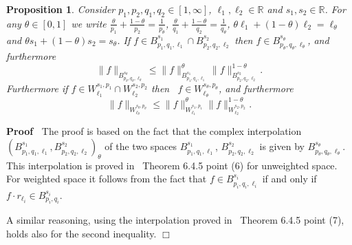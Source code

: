 \documentclass[a4paper,10pt]{article}
\newenvironment{proof}{\noindent\textbf{Proof\ }}{\hspace*{\fill}$\Box$\medskip}
\newtheorem{proposition}[theorem]{Proposition}
{\theorembodyfont{\rmfamily}\newtheorem{remark}[theorem]{Remark}}
\begin{document}
\begin{proposition}
  \label{proposition_interpolation}Consider $p_1, p_2, q_1, q_2 \in [1,
  \infty]$, $\ell_1, \ell_2 \in \mathbb{R}$ and $s_1, s_2 \in \mathbb{R}$. For
  any $\theta \in [0, 1]$ we write $\frac{\theta}{p_1} + \frac{1 -
  \theta}{p_2} = \frac{1}{p_{\theta}}$, $\frac{\theta}{q_1} + \frac{1 -
  \theta}{q_2} = \frac{1}{q_{\theta}}$, $\theta \ell_1 + (1 - \theta) \ell_2 =
  \ell_{\theta}$ and $\theta s_1 + (1 - \theta) s_2 = s_{\theta}$. If $f \in
  B^{s_1}_{p_1, q_1, \ell_1} \cap B^{s_2}_{p_2, q_2, \ell_2}$ then $f \in
  B^{s_{\theta}}_{p_{\theta}, q_{\theta}, \ell_{\theta}}$, and furthermore
  \[ \| f \|_{B^{s_{\theta}}_{p_{\theta}, q_{\theta}, \ell_{\theta}}} \leq \|
     f \|_{B^{s_1}_{p_1, q_1, \ell_1}}^{\theta} \| f \|_{B^{s_2}_{p_2, q_2,
     \ell_2}}^{1 - \theta} . \]
  Furthermore if $f \in W^{s_1, p_1}_{\ell_1} \cap W^{s_2, p_2}_{\ell_2}$ then
  \ $f \in W^{s_{\theta}, p_{\theta}}_{\ell_{\theta}}$, and furthermore
  \[ \| f \|_{W^{s_{\theta}, p_{\theta}}_{\ell_{\theta}}} \leq \| f
     \|_{W^{s_1, p_1}_{\ell_1}}^{\theta} \| f \|_{W^{s_2, p_2}_{\ell_2}}^{1 -
     \theta} . \]
\end{proposition}

\begin{proof}
  The proof is based on the fact that the complex interpolation
  $(B^{s_1}_{p_1, q_1, \ell_1}, B^{s_2}_{p_2, q_2, \ell_2})_{\theta}$ of the
  two spaces $B^{s_1}_{p_1, q_1, \ell_1}$, $B^{s_2}_{p_2, q_2, \ell_2}$ is
  given by $B^{s_{\theta}}_{p_{\theta}, q_{\theta}, \ell_{\theta}}$. This
  interpolation is proved in~{\cite{Joran1976}} Theorem 6.4.5 point (6) for
  unweighted space. For weighted space it follows from the fact that $f \in
  B^{s_i}_{p_i, q_i, \ell_i}$ if and only if $f \cdot r_{\ell_i} \in
  B^{s_i}_{p_i, q_i}$.
  
  A similar reasoning, using the interpolation proved in~{\cite{Joran1976}}
  Theorem 6.4.5 point (7), holds also for the second inequality.
\end{proof}




\end{document}
